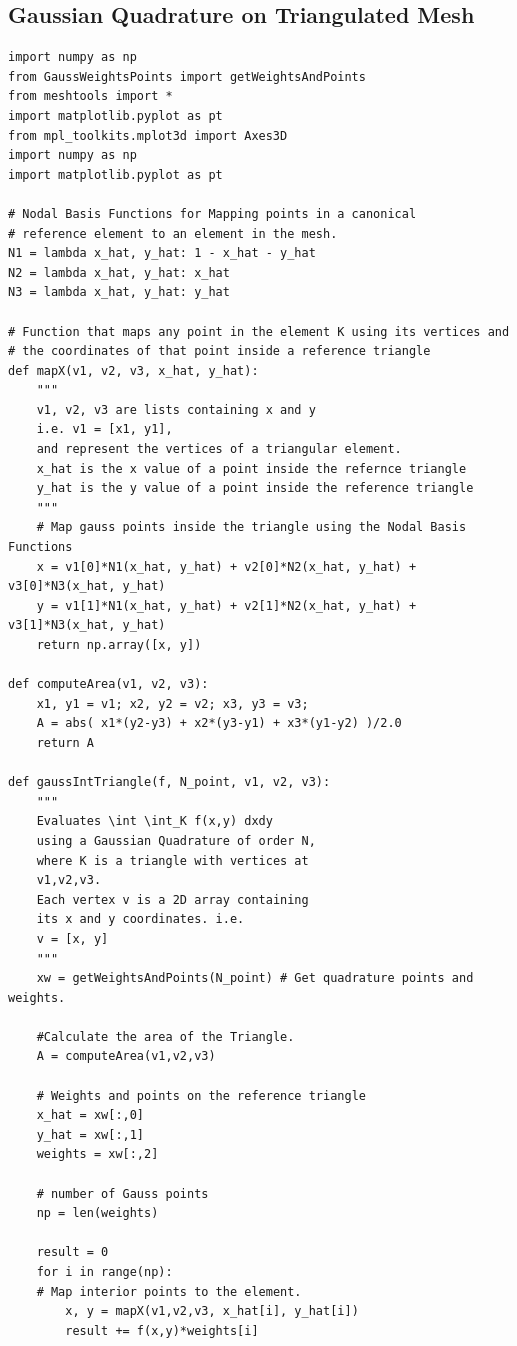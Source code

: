 \documentclass{uonmathreport}
\begin{document}
\subsection{Gaussian Quadrature on Triangulated Mesh} \label{app:gauss_quad}
\begin{verbatim}
import numpy as np
from GaussWeightsPoints import getWeightsAndPoints
from meshtools import *
import matplotlib.pyplot as pt
from mpl_toolkits.mplot3d import Axes3D
import numpy as np
import matplotlib.pyplot as pt

# Nodal Basis Functions for Mapping points in a canonical 
# reference element to an element in the mesh.
N1 = lambda x_hat, y_hat: 1 - x_hat - y_hat
N2 = lambda x_hat, y_hat: x_hat
N3 = lambda x_hat, y_hat: y_hat

# Function that maps any point in the element K using its vertices and
# the coordinates of that point inside a reference triangle
def mapX(v1, v2, v3, x_hat, y_hat):
	"""
	v1, v2, v3 are lists containing x and y
	i.e. v1 = [x1, y1],
	and represent the vertices of a triangular element.
	x_hat is the x value of a point inside the refernce triangle
	y_hat is the y value of a point inside the reference triangle
	"""
	# Map gauss points inside the triangle using the Nodal Basis Functions
	x = v1[0]*N1(x_hat, y_hat) + v2[0]*N2(x_hat, y_hat) + v3[0]*N3(x_hat, y_hat)
	y = v1[1]*N1(x_hat, y_hat) + v2[1]*N2(x_hat, y_hat) + v3[1]*N3(x_hat, y_hat)
	return np.array([x, y])

def computeArea(v1, v2, v3):
	x1, y1 = v1; x2, y2 = v2; x3, y3 = v3;
	A = abs( x1*(y2-y3) + x2*(y3-y1) + x3*(y1-y2) )/2.0
	return A

def gaussIntTriangle(f, N_point, v1, v2, v3):
	""" 
	Evaluates \int \int_K f(x,y) dxdy
	using a Gaussian Quadrature of order N,
	where K is a triangle with vertices at
	v1,v2,v3. 
	Each vertex v is a 2D array containing
	its x and y coordinates. i.e.
	v = [x, y]
	"""
	xw = getWeightsAndPoints(N_point) # Get quadrature points and weights.
			
	#Calculate the area of the Triangle.
	A = computeArea(v1,v2,v3)
	
	# Weights and points on the reference triangle
	x_hat = xw[:,0]
	y_hat = xw[:,1]
	weights = xw[:,2]
	
	# number of Gauss points
	np = len(weights)
	
	result = 0
	for i in range(np):
	# Map interior points to the element.
		x, y = mapX(v1,v2,v3, x_hat[i], y_hat[i])
		result += f(x,y)*weights[i]
	

\end{verbatim}
\end{document}
